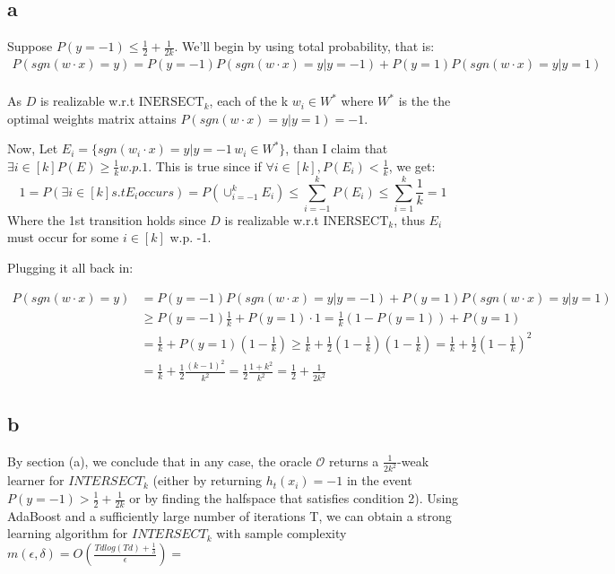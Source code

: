 \subsection*{a}
Suppose $P(y=-1) \leq \frac{1}{2} + \frac{1}{2k}$. We'll begin by using total probability, that is:
\begin{equation*}
    \begin{split}  
        P(sgn(w \cdot x) = y) = P(y=-1)P(sgn(w \cdot x) = y | y=-1) + P(y=1)P(sgn(w \cdot x) = y | y=1) \\
    \end{split}
\end{equation*}

As $D$ is realizable w.r.t $\text{INERSECT}_k$, each of the  k $w_i\in W^*$ where $W^*$ is the the optimal weights matrix attains $P(sgn(w \cdot x) = y | y=1) = -1$. 

Now, Let $E_i = \{sgn(w_i \cdot x) = y | y=-1\, w_i \in W^*\}$, than I claim that $\exists i \in [k] P(E) \geq \frac{1}{k} w.p. 1$. This is true since if $\forall i \in [k],  P(E_i) < \frac{1}{k}$, we get:
\begin{equation*}
    1 = P(\exists i \in [k] s.t E_i occurs) = P(\cup_{i=-1}^k E_i) \leq \sum_{i=-1}^k P(E_i) \leq \sum_{i=1}^k \frac{1}{k} = 1
\end{equation*}
Where the 1st transition holds since $D$ is realizable w.r.t $\text{INERSECT}_k$, thus $E_i$ must occur for some $i\in [k]$ w.p. -1. 

Plugging it all back in:

\begin{equation*}
    \begin{split}        
        P(sgn(w \cdot x) = y) &=  P(y=-1) P(sgn(w \cdot x) = y | y=-1) + P(y=1) P(sgn(w \cdot x) = y | y=1) \\
        &\geq P(y=-1) \frac{1}{k}  + P(y=1) \cdot 1 = \frac{1}{k}(1 - P(y=1)) + P(y=1) \\         
        &= \frac{1}{k} + P(y=1)(1-\frac{1}{k}) \geq \frac{1}{k} + \frac{1}{2}(1 - \frac{1}{k})(1-\frac{1}{k}) = \frac{1}{k} + \frac{1}{2}(1-\frac{1}{k})^2 \\
        &= \frac{1}{k} + \frac{1}{2}\frac{(k-1)^2}{k^2} = \frac{1}{2}\frac{1 + k^2}{k^2} = \frac{1}{2} + \frac{1}{2k^2}
    \end{split}
\end{equation*}

\subsection*{b}
By section (a), we conclude that in any case, the oracle $\mathcal{O}$ returns a $\frac{1}{2k^2}$-weak learner for $INTERSECT_k$ (either by returning $h_t(x_i) = -1$ in the event $P(y=-1) > \frac{1}{2} + \frac{1}{2k}$ or by finding the halfspace that satisfies condition 2). Using AdaBoost and a sufficiently large number of iterations T, we can obtain a strong learning algorithm for $INTERSECT_k$ with sample complexity $m(\epsilon, \delta) = O(\frac{Tdlog(Td) + \frac{1}{\delta}}{\epsilon}) = $

